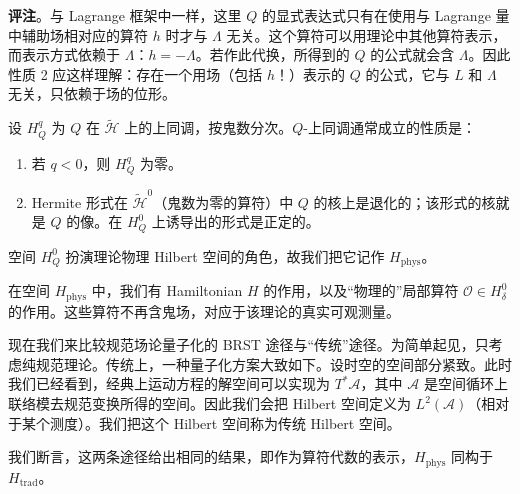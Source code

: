 \textbf{评注}。与 Lagrange 框架中一样，这里 $Q$ 的显式表达式只有在使用与 Lagrange 量中辅助场相对应的算符 $h$ 时才与 $\Lambda$ 无关。这个算符可以用理论中其他算符表示，而表示方式依赖于 $\Lambda$：$h=-\Lambda$。若作此代换，所得到的 $Q$ 的公式就会含 $\Lambda$。因此性质 2 应这样理解：存在一个用场（包括 $h$！）表示的 $Q$ 的公式，它与 $L$ 和 $\Lambda$ 无关，只依赖于场的位形。

设 $H^q_Q$ 为 $Q$ 在 $\widetilde{\mathcal{H}}$ 上的上同调，按鬼数分次。$Q$-上同调通常成立的性质是：

\begin{enumerate}
  \item 若 $q<0$，则 $H^q_Q$ 为零。
  \item Hermite 形式在 $\widetilde{\mathcal{H}}^0$（鬼数为零的算符）中 $Q$ 的核上是退化的；该形式的核就是 $Q$ 的像。在 $H^0_Q$ 上诱导出的形式是正定的。
\end{enumerate}

空间 $H^0_Q$ 扮演理论物理 Hilbert 空间的角色，故我们把它记作 $H_{\mathrm{phys}}$。

在空间 $H_{\mathrm{phys}}$ 中，我们有 Hamiltonian $H$ 的作用，以及“物理的”局部算符 $\mathcal{O}\in H^0_\delta$ 的作用。这些算符不再含鬼场，对应于该理论的真实可观测量。

现在我们来比较规范场论量子化的 BRST 途径与“传统”途径。为简单起见，只考虑纯规范理论。传统上，一种量子化方案大致如下。设时空的空间部分紧致。此时我们已经看到，经典上运动方程的解空间可以实现为 $T^*\mathcal{A}$，其中 $\mathcal{A}$ 是空间循环上联络模去规范变换所得的空间。因此我们会把 Hilbert 空间定义为 $L^2(\mathcal{A})$（相对于某个测度）。我们把这个 Hilbert 空间称为传统 Hilbert 空间。

我们断言，这两条途径给出相同的结果，即作为算符代数的表示，$H_{\mathrm{phys}}$ 同构于 $H_{\mathrm{trad}}$。


